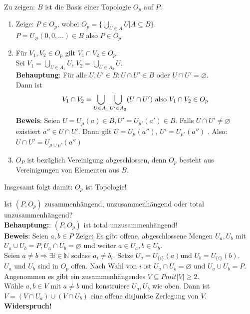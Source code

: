 \begin{problem*}[2a]
Zu zeigen: $B$ ist die Basis einer Topologie $O_p$ auf $ P$.
\begin{enumerate}
  \item Zeige: $P \in O_p$, wobei $O_p = \{ \bigcup_{U \in A } U | A \subseteq B \}$. \\
  $P = U_{ \varnothing } (0,0, \dots) \in B$ also $P \in O_p$
  \item Für $V_1,V_2 \in O_p$ gilt $ V_1 \cap V_2 \in O_p$.\\
  Sei $V_1 = \bigcup_{ U \in A_1} U $, $V_2 = \bigcup_{ U \in A_2} U $.\\
  \textbf{Behauptung}: Für alle $U,U' \in B: U \cap U' \in B$ oder $U \cap U' = \varnothing$.\\
  Dann ist 
  \begin{equation*}
    V_1 \cap V_2 = \bigcup_{ U \in A_1 }\bigcup_{ U' \in A_2 } (U \cap U')$ also $ V_1 \cap V_2 \in O_p\\
  \end{equation*}
  \textbf{Beweis}: Seien $U = U_{ \mu } (a) \in B , U' = U_{ \mu' } (a') \in B $. Falls $U \cap U' \neq \varnothing$ existiert $a'' \in U \cap U'$. Dann gilt $U = U_{ \mu }(a'')$, $U' = U_{ \mu' }(a'')$ . Also:\\
  $U \cap U' = U_{ \mu \cup \mu' } (a'')$
  \item $ O_P $ ist bezüglich Vereinigung abgeschlossen, denn $ O_p $ besteht aus Vereinigungen von Elementen aus $ B $. \\
\end{enumerate}
Insgesamt folgt damit: $ O_p $ ist Topologie!  
\end{problem*}

\begin{problem*}[2b]
Ist $ (P, O_p)$  zusammenhängend, unzusammenhängend oder total unzusammenhängend?\\
\textbf{Behauptung:}: $ (P, O_p)$ ist total unzusammenhängend!\\
\textbf{Beweis}: Seien $ a,b \in P$ Zeige: Es gibt offene, abgeschlossene Mengen $ U_a, U_b$ mit $U_a \cup U_b = P, U_a \cap U_b = \varnothing$ und weiter $ a \in U_a , b \in U_b$.\\
Seien $a \neq b \Rightarrow \exists i \in \mathbb{N}$ sodass $a_i \neq b_i$. Setze $ U_a = U_{\{ i \}}(a)$und $ U_b = U_{\{ i \}}(b)$.\\
$ U_a $ und $ U_b $ sind in $ O_p $ offen. Nach Wahl von $i $ ist $ U_a \cap U_b = \varnothing$ und $ U_a \cup U_b = P$. Angenommen es gibt ein zusammenhängendes $V \subseteq P mit \vert V \vert \geq 2$.\\
Wähle $a, b \in V$ mit $ a \neq b$ und konstruiere $U_a, U_b$ wie oben. Dann ist $ V = (V \cap U_a) \cup (V \cap U_b)$ eine offene disjunkte Zerlegung von $ V $. \textbf{Widerspruch!}

\end{problem*}

